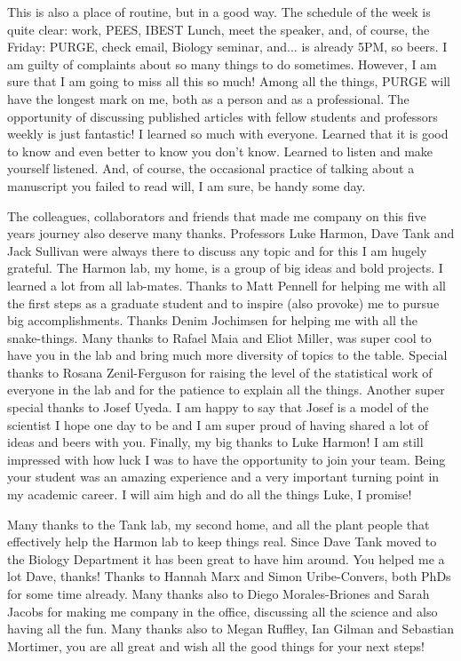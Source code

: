 This is also a place of routine, but in a good way. The schedule of the week is quite clear: work, PEES, IBEST Lunch, meet the speaker, and, of course, the Friday: PURGE, check email, Biology seminar, and... is already 5PM, so beers. I am guilty of complaints about so many things to do sometimes. However, I am sure that I am going to miss all this so much! Among all the things, PURGE will have the longest mark on me, both as a person and as a professional. The opportunity of discussing published articles with fellow students and professors weekly is just fantastic! I learned so much with everyone. Learned that it is good to know and even better to know you don't know. Learned to listen and make yourself listened. And, of course, the occasional practice of talking about a manuscript you failed to read will, I am sure, be handy some day.

The colleagues, collaborators and friends that made me company on this five years journey also deserve many thanks. Professors Luke Harmon, Dave Tank and Jack Sullivan were always there to discuss any topic and for this I am hugely grateful. The Harmon lab, my home, is a group of big ideas and bold projects. I learned a lot from all lab-mates. Thanks to Matt Pennell for helping me with all the first steps as a graduate student and to inspire (also provoke) me to pursue big accomplishments. Thanks Denim Jochimsen for helping me with all the snake-things. Many thanks to Rafael Maia and Eliot Miller, was super cool to have you in the lab and bring much more diversity of topics to the table. Special thanks to Rosana Zenil-Ferguson for raising the level of the statistical work of everyone in the lab and for the patience to explain all the things. Another super special thanks to Josef Uyeda. I am happy to say that Josef is a model of the scientist I hope one day to be and I am super proud of having shared a lot of ideas and beers with you. Finally, my big thanks to Luke Harmon! I am still impressed with how luck I was to have the opportunity to join your team. Being your student was an amazing experience and a very important turning point in my academic career. I will aim high and do all the things Luke, I promise!

Many thanks to the Tank lab, my second home, and all the plant people that effectively help the Harmon lab to keep things real. Since Dave Tank moved to the Biology Department it has been great to have him around. You helped me a lot Dave, thanks! Thanks to Hannah Marx and Simon Uribe-Convers, both PhDs for some time already. Many thanks also to Diego Morales-Briones and Sarah Jacobs for making me company in the office, discussing all the science and also having all the fun. Many thanks also to Megan Ruffley, Ian Gilman and Sebastian Mortimer, you are all great and wish all the good things for your next steps!

